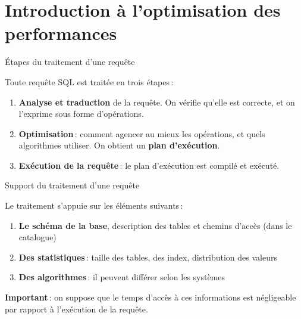 

\section{Introduction à l'optimisation des performances}
\begin{tsp}{\'Etapes du traitement d'une requête}{

Toute requête SQL est traitée en trois étapes\,:

\begin{enumerate}
  \item \textbf{Analyse et traduction} de la requête. On vérifie
            qu'elle est correcte, et on l'exprime sous forme
             d'opérations.

  \item \textbf{Optimisation}\,: comment agencer au mieux les opérations,
              et quels algorithmes utiliser. On obtient un \textbf{plan
              d'exécution}.

    \item \textbf{Exécution de la requête}\,: le plan d'exécution est compilé
            et exécuté.
\end{enumerate}
}\end{tsp}
\begin{tsp}{Support du traitement d'une requête}{

Le traitement s'appuie sur les éléments suivants\,:

\begin{enumerate}
  \item \textbf{Le schéma de la base}, description
          des tables et chemins d'accès (dans le catalogue)

  \item \textbf{Des statistiques}\,: taille des tables, des index,
              distribution des valeurs

    \item \textbf{Des algorithmes}\,: il peuvent
               différer selon  les systèmes
\end{enumerate}

\textbf{Important}\,: on suppose que le temps d'accès à
ces informations est négligeable par rapport à l'exécution
de la requête.
}\end{tsp}
